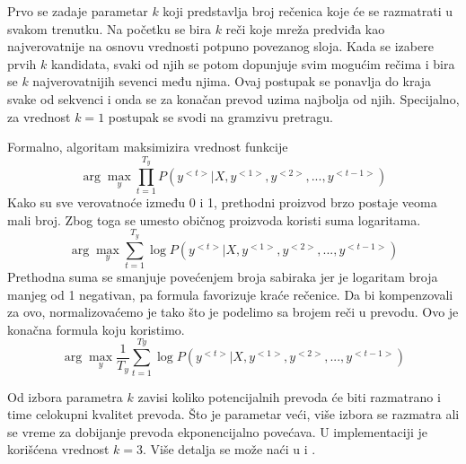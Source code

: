 \documentclass[a4paper]{article}
\begin{document}
Prvo se zadaje parametar $k$ koji predstavlja broj rečenica koje će se razmatrati u svakom trenutku. Na početku se bira $k$ reči koje mreža predviđa kao najverovatnije na osnovu vrednosti potpuno povezanog sloja. Kada se izabere prvih $k$ kandidata, svaki od njih se potom dopunjuje svim mogućim rečima i bira se $k$ najverovatnijih sevenci među njima.
Ovaj postupak se ponavlja do kraja svake od sekvenci i onda se za konačan prevod uzima najbolja od njih. Specijalno, za vrednost $k = 1$ postupak se svodi na gramzivu pretragu.

Formalno, algoritam maksimizira vrednost funkcije
$$\arg\max_{y} \prod_{t=1}^{T_y} P(y^{<t>}|X, y^{<1>}, y^{<2>}, ..., y^{<t-1>})$$
Kako su sve verovatnoće između 0 i 1, prethodni proizvod brzo postaje veoma mali broj. Zbog toga se umesto običnog proizvoda koristi suma logaritama.
$$\arg\max_{y} \sum_{t=1}^{T_y} \log P(y^{<t>}|X, y^{<1>}, y^{<2>}, ..., y^{<t-1>})$$
Prethodna suma se smanjuje povećenjem broja sabiraka jer je logaritam broja manjeg od 1 negativan, pa formula favorizuje kraće rečenice. Da bi kompenzovali za ovo, normalizovaćemo je tako što je podelimo sa brojem reči u prevodu. Ovo je konačna formula koju koristimo.
$$\arg\max_{y} \frac{1}{T_y} \sum_{t=1}^{Ty} \log P(y^{<t>}|X, y^{<1>}, y^{<2>}, ..., y^{<t-1>})$$

Od izbora parametra $k$ zavisi koliko potencijalnih prevoda će biti razmatrano i time celokupni kvalitet prevoda. Što je parametar veći, više izbora se razmatra ali se vreme za dobijanje prevoda ekponencijalno povećava. U implementaciji je korišćena vrednost $k = 3$. Više detalja se može naći u \cite{Freitag_2017} i \cite{aritificial2009}.

\end{document}
